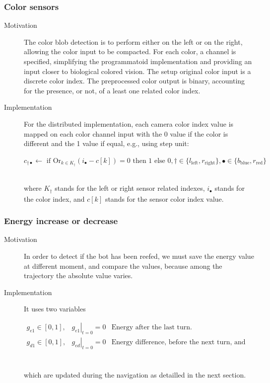 \documentclass[a4]{article} \usepackage[left=2cm,right=3cm,top=1cm,bottom=2cm]{geometry}
\newcommand{\eqline}[1]{~\vspace{0.1cm}\\\centerline{$#1$}\vspace{0.1cm}\\}
\begin{document}
\subsubsection{Color sensors}\begin{description}
\item[Motivation] The color blob detection is to perform either on the left or on the right, allowing the color input to be compacted. For each color, a channel is specified, simplifying the programmatoid implementation and providing an input closer to biological colored vision. The setup original color input is a discrete color index. The preprocessed color output is binary, accounting for the presence, or not, of a least one related color index.  
\item[Implementation] For the distributed implementation, each camera color index value is mapped on each color channel input with the 0 value if the color is different and the 1 value if equal, e.g., using step unit:
  \eqline{c_{\dagger\bullet} \leftarrow \mbox{ if } \mbox{Or}_{k \in K_\dagger} (i_{\bullet} - c[k]) = 0 \mbox{ then } 1 \mbox{ else } 0, \dagger \in \{l_{\mbox{left}}, r_{\mbox{right}}\}, \bullet \in \{b_{\mbox{blue}}, r_{\mbox{red}}\}}
 where $K_\dagger$ stands for the left or right sensor related indexes, $i_{\bullet}$ stands for the color index, and $c[k]$ stands for the sensor color index value.
\end{description}

\subsubsection{Energy increase or decrease}\begin{description}
\item[Motivation] In order to detect if the bot has been reefed, we must save the energy value at different moment, and compare the values, because among the trajectory the absolute value varies.
\item[Implementation] It uses two variables
\eqline{\begin{array}{lll}
  g_{e1} \in [0, 1], &\left.g_{e1}\right|_{t = 0} = 0 & \mbox{Energy after the last turn.} \\
  g_{d1} \in [0, 1], &\left.g_{ed}\right|_{t = 0} = 0 & \mbox{Energy difference, before the next turn, and after the last turn.} \\
\end{array}}
which are updated during the navigation as detailled in the next section.
\end{description}
\end{document}
